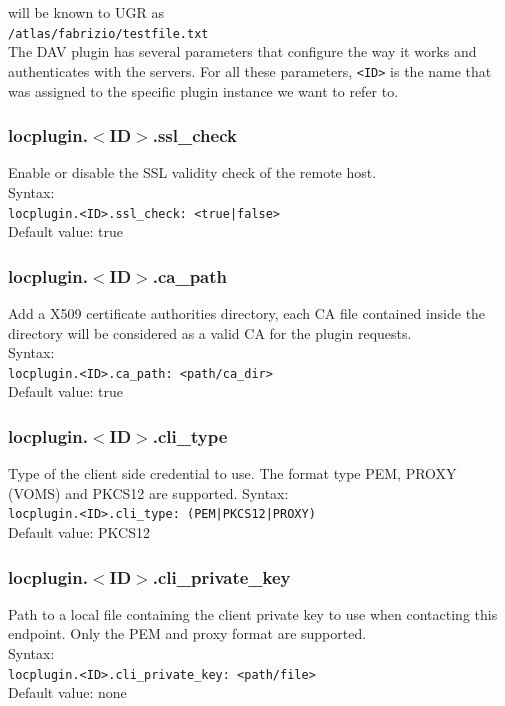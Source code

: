 \documentclass[12pt]{article} %
\begin{document}
will be known to UGR as\\
\lstinline"/atlas/fabrizio/testfile.txt"\\

The DAV plugin has several parameters that configure the way it works and authenticates with the servers. For all these parameters, \lstinline"<ID>" is the name that was assigned to the specific plugin instance we want to refer to.

\subsubsection{locplugin.$<$ID$>$.ssl\_check}
Enable or disable the SSL validity check of the remote host.\\
Syntax:\\
\lstinline"locplugin.<ID>.ssl_check: <true|false>"\\
Default value: true\\
\subsubsection{locplugin.$<$ID$>$.ca\_path}
Add a X509 certificate authorities directory, each CA file contained inside the directory will be considered as a valid CA for the plugin requests.\\
Syntax:\\
\lstinline"locplugin.<ID>.ca_path: <path/ca_dir>"\\
Default value: true\\
\subsubsection{locplugin.$<$ID$>$.cli\_type}
Type of the client side credential to use. The format type PEM, PROXY (VOMS) and PKCS12 are supported.
Syntax:\\
\lstinline"locplugin.<ID>.cli_type: (PEM|PKCS12|PROXY)"\\
Default value: PKCS12\\
\subsubsection{locplugin.$<$ID$>$.cli\_private\_key}
Path to a local file containing the client private key to use when contacting this endpoint. Only the PEM and proxy format are supported.\\
Syntax:\\
\lstinline"locplugin.<ID>.cli_private_key: <path/file>"\\
Default value: none\\
\end{document}
